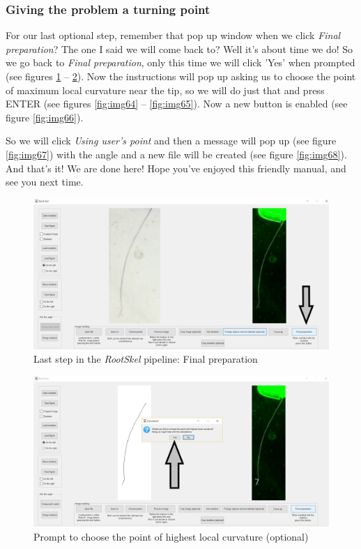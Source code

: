 \subsubsection{Giving the problem a turning point}

For our last optional step, remember that pop up window when we click \textit{Final preparation}? The one I said we will come back to?
Well it's about time we do! So we go back to \textit{Final preparation}, only this time we will click 'Yes' when prompted (see figures \ref{fig:img62} -- \ref{fig:img63}).
Now the instructions will pop up asking us to choose the point of maximum local curvature near the tip, so we will do just that and press ENTER (see figures \ref{fig:img64} -- \ref{fig:img65}). Now a new button is enabled (see figure \ref{fig:img66}).

So we will click \textit{Using user's point} and then a message will pop up (see figure \ref{fig:img67}) with the angle and a new file will be created (see figure \ref{fig:img68}).
And that's it! We are done here! Hope you've enjoyed this friendly manual, and see you next time. 

\begin{figure}[H]
	\centering
	\includegraphics[width=\textwidth]{../Figures/manual/optionalE1.jpg}
	\caption{Last step in the \textit{RootSkel} pipeline: Final preparation}
	\label{fig:img62}
\end{figure}

\begin{figure}[H]
	\centering
	\includegraphics[width=\textwidth]{../Figures/manual/optionalE2.jpg}
	\caption{Prompt to choose the point of highest local curvature (optional)}
	\label{fig:img63}
\end{figure}


